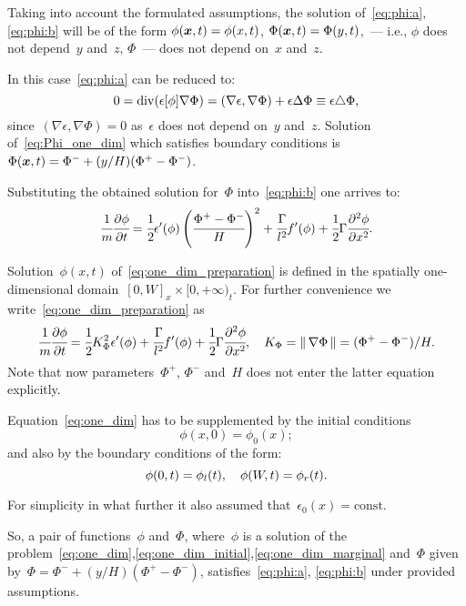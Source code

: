 Taking into account the formulated assumptions,
the solution of~\eqref{eq:phi:a},\eqref{eq:phi:b} will be of the form
$\phi({\boldsymbol{x}}, t) = \phi(x, t)$, $\Phi({\boldsymbol{x}}, t) = \Phi(y, t)$,~---
i.e.,  $\phi$ does not depend~$y$ and~$z$, $\Phi$~--- does not depend on~$x$ and~$z$.

In this case~\eqref{eq:phi:a} can be reduced to:
\begin{equation}
  0 = \operatorname{{div}}(\epsilon[\phi] \nabla \Phi) = (\nabla \epsilon, \nabla \Phi) + \epsilon \Delta \Phi \equiv  \epsilon \triangle \Phi,
  \label{eq:Phi_one_dim}
\end{equation}
since~$(\nabla \epsilon, \nabla \Phi) = 0$ as~$\epsilon$ does not depend on~$y$ and~$z$.
Solution of~\eqref{eq:Phi_one_dim} which satisfies boundary conditions is~$\Phi({\boldsymbol{x}}, t) = \Phi^- + (y / H)(\Phi^+ - \Phi^-)$.

Substituting the obtained solution for~$\Phi$ into~\eqref{eq:phi:b} one arrives to:
\begin{equation}
  \cfrac{1}{m} \cfrac{\partial \phi}{\partial t} = \cfrac{1}{2} \epsilon'(\phi) \left( \cfrac{\Phi^+ - \Phi^-}{H} \right)^2 + \cfrac{\Gamma}{l^2} f'(\phi) + \cfrac{1}{2} \Gamma \cfrac{\partial^2 \phi}{\partial x^2} {\text{.}}
  \label{eq:one_dim_preparation}
\end{equation}

Solution~$\phi(x, t)$ of~\eqref{eq:one_dim_preparation} is defined in
the spatially one-dimensional domain~$[0, W]_x \times [0, +\infty)_t$.
For further convenience we write~\eqref{eq:one_dim_preparation} as
\begin{equation}
  \cfrac{1}{m} \cfrac{\partial \phi}{\partial t} = \cfrac{1}{2} K_\Phi^2 \epsilon'(\phi) + \cfrac{\Gamma}{l^2} f'(\phi) + \cfrac{1}{2} \Gamma \cfrac{\partial^2 \phi}{\partial x^2},\quad
  K_\Phi = \| \, \nabla \Phi \, \| = (\Phi^+ - \Phi^-) / H. 
  \label{eq:one_dim}
\end{equation}
Note that now parameters~$\Phi^+$, $\Phi^-$ and~$H$ does not enter the latter equation explicitly.

Equation~\eqref{eq:one_dim} has to be supplemented by the initial conditions
\begin{equation}
	\phi(x, 0) = \phi_0(x);
	\label{eq:one_dim_initial}
\end{equation}
and also by the boundary conditions of the form:
\begin{equation}
  \phi(0, t) = \phi_l(t), \quad \phi(W, t) = \phi_r(t) {\text{.}}
  \label{eq:one_dim_marginal}
\end{equation}

For simplicity in what further it also assumed that~$\epsilon_0(x) = \text{const}$.

So, a pair of functions~$\phi$ and~$\Phi$,
where~$\phi$ is a solution of the problem~\eqref{eq:one_dim},\eqref{eq:one_dim_initial},\eqref{eq:one_dim_marginal}
and~$\Phi$ given by~$\Phi = \Phi^- + (y / H)(\Phi^+ - \Phi^-)$,
satisfies~\eqref{eq:phi:a}, \eqref{eq:phi:b} under provided assumptions.

\endinput

